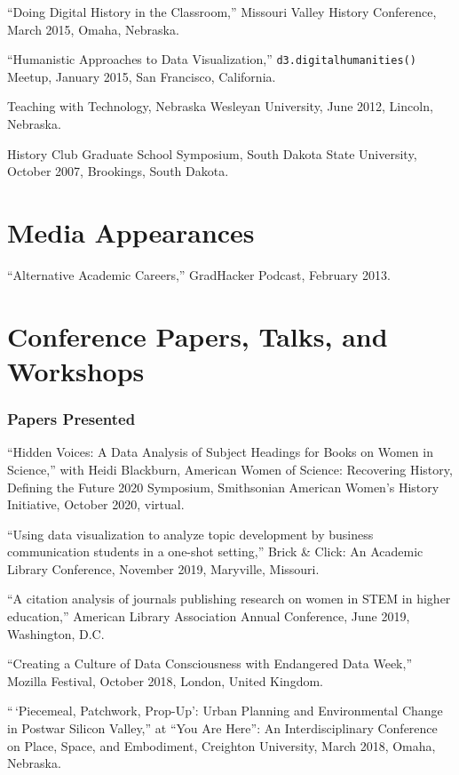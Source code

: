 ``Doing Digital History in the Classroom,'' Missouri Valley History
Conference, March 2015, Omaha, Nebraska.

``Humanistic Approaches to Data Visualization,''
\texttt{d3.digitalhumanities()} Meetup, January 2015, San Francisco,
California.

Teaching with Technology, Nebraska Wesleyan University, June 2012,
Lincoln, Nebraska.

History Club Graduate School Symposium, South Dakota State University,
October 2007, Brookings, South Dakota.

\section{Media Appearances}\label{media-appearances}

``Alternative Academic Careers,'' GradHacker Podcast, February 2013.

\section{Conference Papers, Talks, and
Workshops}\label{conference-papers-talks-and-workshops}

\subsubsection{Papers Presented}\label{papers-presented}

``Hidden Voices: A Data Analysis of Subject Headings for Books on Women
in Science,'' with Heidi Blackburn, American Women of Science:
Recovering History, Defining the Future 2020 Symposium, Smithsonian
American Women's History Initiative, October 2020, virtual.

``Using data visualization to analyze topic development by business
communication students in a one-shot setting,'' Brick \& Click: An
Academic Library Conference, November 2019, Maryville, Missouri.

``A citation analysis of journals publishing research on women in STEM
in higher education,'' American Library Association Annual Conference,
June 2019, Washington, D.C.

``Creating a Culture of Data Consciousness with Endangered Data Week,''
Mozilla Festival, October 2018, London, United Kingdom.

``\,`Piecemeal, Patchwork, Prop-Up': Urban Planning and Environmental
Change in Postwar Silicon Valley,'' at ``You Are Here'': An
Interdisciplinary Conference on Place, Space, and Embodiment, Creighton
University, March 2018, Omaha, Nebraska.

